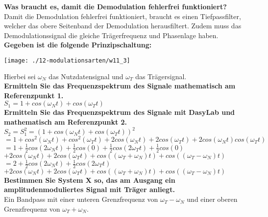 \textbf{Was braucht es, damit die Demodulation fehlerfrei funktioniert?}\\
Damit die Demodulation fehlerfrei funktioniert, braucht es einen Tiefpassfilter, welcher das obere Seitenband der Demodulation herausfiltert. Zudem muss das Demodulationssignal die gleiche Trägerfrequenz und Phasenlage haben.\\

\textbf{Gegeben ist die folgende Prinzipschaltung:}
\begin{center}
    \vspace{-8pt}
    \texttt{[image: ./12-modulationsarten/w11\_3]}
    \vspace{-8pt}
\end{center}

Hierbei sei $\omega_N$ das Nutzdatensignal und $\omega_T$ das Trägersignal.\\

\textbf{Ermitteln Sie das Frequenzspektrum des Signale mathematisch am Referenzpunkt 1.}\\
$S_1=1+cos(\omega_Nt)+cos(\omega_Tt)$\\

\textbf{Ermitteln Sie das Frequenzspektrum des Signale mit DasyLab und mathematisch am Referenzpunkt 2.}\\
$S_2=S_1^2=(1+cos(\omega_Nt)+cos(\omega_Tt))^2$\\
$=1+cos^2(\omega_Nt)+cos^2(\omega_Tt)+2cos(\omega_Nt)+2cos(\omega_Tt)+2cos(\omega_Nt)cos(\omega_Tt)$\\
$=1+\frac{1}{2}cos(2\omega_Nt)+\frac{1}{2}cos(0)+\frac{1}{2}cos(2\omega_Tt)+\frac{1}{2}cos(0)$\\
$+2cos(\omega_Nt)+2cos(\omega_Tt)+cos((\omega_T+\omega_N)t)+cos((\omega_T-\omega_N)t)$\\
$=2+\frac{1}{2}cos(2\omega_Nt)+\frac{1}{2}cos(2\omega_Tt)$\\
$+2cos(\omega_Nt)+2cos(\omega_Tt)+cos((\omega_T+\omega_N)t)+cos((\omega_T-\omega_N)t)$\\

\textbf{Bestimmen Sie System X so, das am Ausgang ein amplitudenmoduliertes Signal mit Träger anliegt.}\\
Ein Bandpass mit einer unteren Grenzfrequenz von $\omega_T-\omega_N$ und einer oberen Grenzfrequenz von $\omega_T+\omega_N$.